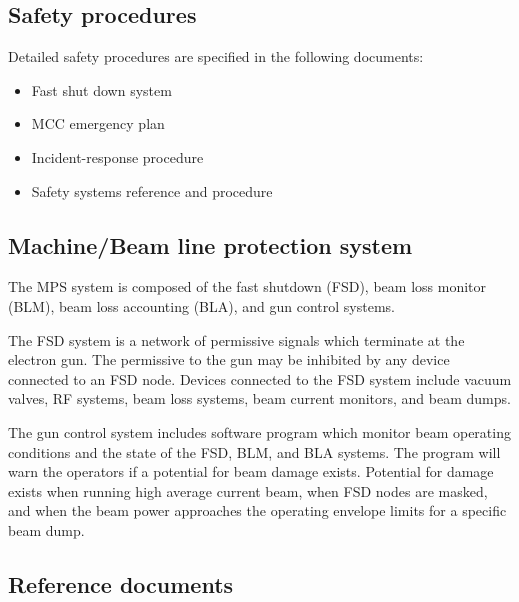 \subsection{Safety procedures}

Detailed safety procedures are specified in the following documents:

\begin{itemize}
\item{Fast shut down system}
\item{MCC emergency plan}
\item{Incident-response procedure}
\item{Safety systems reference and procedure}
\end{itemize}

\subsection{Machine/Beam line protection system}

The MPS system is composed of the fast shutdown (FSD), beam loss
monitor (BLM), beam loss accounting (BLA), and gun control systems.

The FSD system is a network of permissive signals which terminate
at the electron gun. The permissive to the gun may be inhibited by any 
device connected to an FSD node.
Devices connected to the FSD system include vacuum valves, RF
systems, beam loss systems, beam current monitors, and beam dumps.

The gun control system includes software program which monitor
beam operating conditions and the state of the FSD, BLM, and BLA systems.
The program will warn the operators if a potential for beam damage
exists. Potential for damage exists when running high average current
beam, when FSD nodes are masked, and when the beam power approaches
the operating envelope limits for a specific beam dump.

\subsection{Reference documents}

